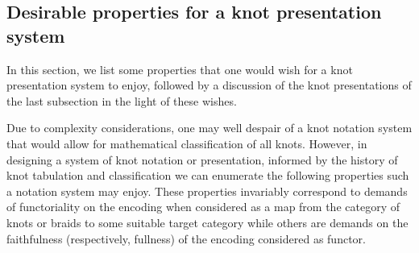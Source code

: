 \subsection{Desirable properties for a knot presentation system }\label{sub:desirable_properties_for_a_knot_notation_system_} %

In this section, we list some properties that one would wish for a
knot presentation system to enjoy, followed by a discussion of the
knot presentations of the last subsection in the light of these
wishes.

Due to complexity considerations, one may well despair of a knot
notation system that would allow for mathematical classification of
all knots. However, in designing a system of knot notation or
presentation, informed by the history of knot tabulation and
classification we can enumerate the following properties such a
notation system may enjoy. These properties invariably correspond to
demands of functoriality on the encoding when considered as a map from
the category of knots or braids to some suitable target category while
others are demands on the faithfulness (respectively, fullness) of the
encoding considered as functor.


